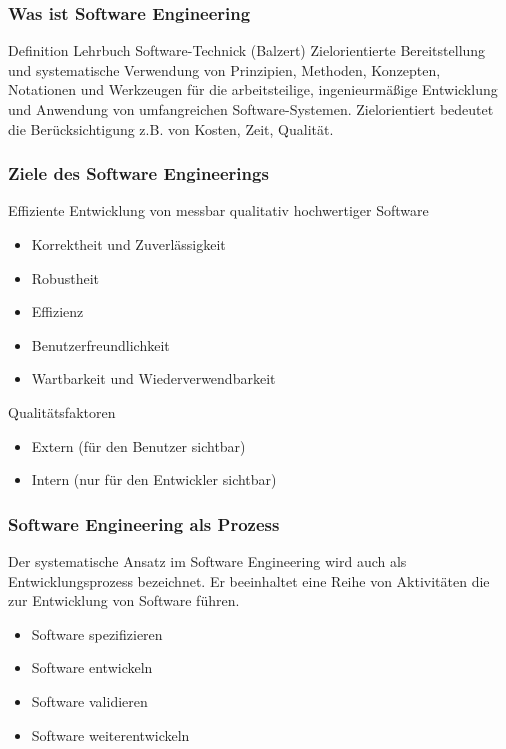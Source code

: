 \begin{frame}
\frametitle{Was ist Software Engineering}
	\begin{block}{Definition Lehrbuch Software-Technick (Balzert) }
		Zielorientierte Bereitstellung und systematische Verwendung von Prinzipien, Methoden, Konzepten, 
		Notationen und Werkzeugen für die arbeitsteilige, ingenieurmäßige Entwicklung und Anwendung von 
		umfangreichen Software-Systemen. Zielorientiert bedeutet die Berücksichtigung z.B. von Kosten, 
		Zeit, Qualität.
	\end{block}
\end{frame}

\begin{frame}
\frametitle{Ziele des Software Engineerings}
	Effiziente Entwicklung von messbar qualitativ hochwertiger Software
	\small
	\begin{itemize}
		\item Korrektheit und Zuverlässigkeit
		\item Robustheit
		\item Effizienz
		\item Benutzerfreundlichkeit
		\item Wartbarkeit und Wiederverwendbarkeit
	\end{itemize}
	\normalsize
	Qualitätsfaktoren
	\small
	\begin{itemize}
		\item Extern (für den Benutzer sichtbar)
		\item Intern (nur für den Entwickler sichtbar)
	\end{itemize}
	\normalsize
	\normalsize
\end{frame}

\begin{frame}
\frametitle{Software Engineering als Prozess}
Der systematische Ansatz im Software Engineering wird auch als
Entwicklungsprozess bezeichnet. Er beeinhaltet eine Reihe von Aktivitäten
die zur Entwicklung von Software führen.
\begin{itemize}
	\item Software spezifizieren
	\item Software entwickeln
	\item Software validieren
	\item Software weiterentwickeln
\end{itemize}
\end{frame}

